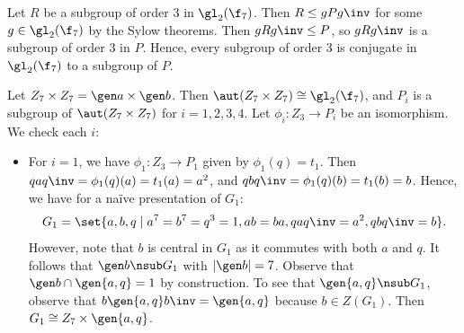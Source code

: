 \begin{solalph}
    Let $R$ be a subgroup of order 3 in $\gl_2(\f_7)$. Then $R \leq gPg\inv$ for some $g \in \gl_2(\f_7)$ by the Sylow theorems. Then $gRg\inv \leq P$, so $gRg\inv$ is a subgroup of order 3 in $P$. Hence, every subgroup of order 3 is conjugate in $\gl_2(\f_7)$ to a subgroup of $P$.
    \item Let $Z_7 \times Z_7 = \gen a \times \gen b$. Then $\aut(Z_7 \times Z_7) \cong \gl_2(\f_7)$, and $P_i$ is a subgroup of $\aut(Z_7 \times Z_7)$ for $i = 1, 2, 3, 4$. Let $\phi_i : Z_3 \to P_i$ be an isomorphism. We check each $i$:
    \begin{itemize}
        \item For $i = 1$, we have $\phi_1 : Z_3 \to P_1$ given by $\phi_1(q) = t_1$. Then $qaq\inv = \phi_1(q)(a) = t_1(a) = a^2$, and $qbq\inv = \phi_1(q)(b) = t_1(b) = b$. Hence, we have for a na\"ive presentation of $G_1$:
        \[G_1 = \set{a, b, q \mid a^7 = b^7 = q^3 = 1, ab = ba, qaq\inv = a^2, qbq\inv = b}.\]
        However, note that $b$ is central in $G_1$ as it commutes with both $a$ and $q$. It follows that $\gen b \nsub G_1$ with $|\gen b| = 7$. Observe that $\gen b \cap \gen{a, q} = 1$ by construction. To see that $\gen{a, q} \nsub G_1$, observe that $b\gen{a, q}b\inv = \gen{a, q}$ because $b \in Z(G_1)$. Then $G_1 \cong Z_7 \times \gen{a, q}$.


\end{itemize}
\end{solalph}

